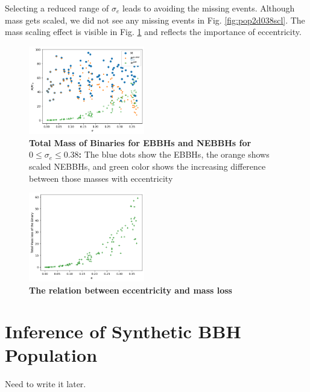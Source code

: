 \documentclass[twocolumn,prd,nofootinbib]{revtex4}
\newcommand\Y[1]{{{}_{#1}Y}}
\begin{document}
Selecting a reduced range of $\sigma_e$ leads to avoiding the missing events. Although mass gets scaled, we did not see any missing events in Fig. \ref{fig:pop2d038scl}. The mass scaling effect is visible in Fig. \ref{fig:pop2d038diff} and reflects the importance of eccentricity.

\begin{figure}[H]
\includegraphics[width=0.45\textwidth]{paper/figures/pop2d038diff.png}
\caption{\label{fig:pop2d038diff}\textbf{Total Mass of Binaries for EBBHs and NEBBHs for $0\leq \sigma_e \leq 0.38$:} The blue dots show the EBBHs, the orange shows scaled NEBBHs, and green color shows the increasing difference between those masses with eccentricity}
\end{figure}

\begin{figure}[H]
\includegraphics[width=0.45\textwidth]{paper/figures/massloss038.png}
\caption{\label{fig:population038}\textbf{The relation between eccentricity and mass loss}}
\end{figure}

\section{Inference of Synthetic BBH Population}


Need to write it later. 







\end{document}
